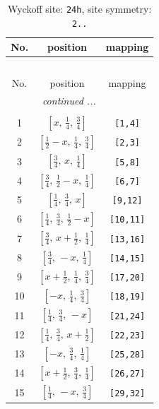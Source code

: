 \documentclass[fleqn,8pt]{jsarticle}
\begin{document}
\begin{longtable}{ccc}
\caption{Wyckoff site: {\tt 24h}, site symmetry: {\tt 2..}}
 \\
 \hline \hline
No. & position & mapping \\ \hline \endfirsthead

\multicolumn{2}{l}{\tablename\ \thetable{}} \\
 \hline \hline
No. & position & mapping \\ \hline \endhead

 \hline \hline
\multicolumn{2}{r}{\footnotesize\it continued ...} \\ \endfoot

 \hline \hline
\multicolumn{2}{r}{} \\ \endlastfoot

1 & $\left[ x,\, \frac{1}{4},\, \frac{3}{4} \right]$ & {\tt [1,4]} \\ \hline
2 & $\left[ \frac{1}{2} - x,\, \frac{1}{4},\, \frac{3}{4} \right]$ & {\tt [2,3]} \\ \hline
3 & $\left[ \frac{3}{4},\, x,\, \frac{1}{4} \right]$ & {\tt [5,8]} \\ \hline
4 & $\left[ \frac{3}{4},\, \frac{1}{2} - x,\, \frac{1}{4} \right]$ & {\tt [6,7]} \\ \hline
5 & $\left[ \frac{1}{4},\, \frac{3}{4},\, x \right]$ & {\tt [9,12]} \\ \hline
6 & $\left[ \frac{1}{4},\, \frac{3}{4},\, \frac{1}{2} - x \right]$ & {\tt [10,11]} \\ \hline
7 & $\left[ \frac{3}{4},\, x + \frac{1}{2},\, \frac{1}{4} \right]$ & {\tt [13,16]} \\ \hline
8 & $\left[ \frac{3}{4},\, - x,\, \frac{1}{4} \right]$ & {\tt [14,15]} \\ \hline
9 & $\left[ x + \frac{1}{2},\, \frac{1}{4},\, \frac{3}{4} \right]$ & {\tt [17,20]} \\ \hline
10 & $\left[ - x,\, \frac{1}{4},\, \frac{3}{4} \right]$ & {\tt [18,19]} \\ \hline
11 & $\left[ \frac{1}{4},\, \frac{3}{4},\, - x \right]$ & {\tt [21,24]} \\ \hline
12 & $\left[ \frac{1}{4},\, \frac{3}{4},\, x + \frac{1}{2} \right]$ & {\tt [22,23]} \\ \hline
13 & $\left[ - x,\, \frac{3}{4},\, \frac{1}{4} \right]$ & {\tt [25,28]} \\ \hline
14 & $\left[ x + \frac{1}{2},\, \frac{3}{4},\, \frac{1}{4} \right]$ & {\tt [26,27]} \\ \hline
15 & $\left[ \frac{1}{4},\, - x,\, \frac{3}{4} \right]$ & {\tt [29,32]} \\ \hline

\end{longtable}
\end{document}
